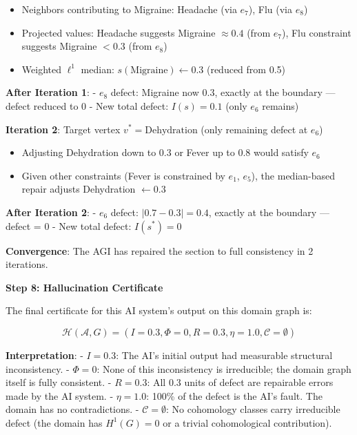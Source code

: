 \documentclass[
]{article}
\providecommand{\tightlist}{%
  \setlength{\itemsep}{0pt}\setlength{\parskip}{0pt}}
\begin{document}
\begin{itemize}
\tightlist
\item
  Neighbors contributing to Migraine: Headache (via \(e_7\)), Flu (via
  \(e_8\))
\item
  Projected values: Headache suggests Migraine \(\approx 0.4\) (from
  \(e_7\)), Flu constraint suggests Migraine \(< 0.3\) (from \(e_8\))
\item
  Weighted \(\ell^1\) median: \(s(\text{Migraine}) \gets 0.3\) (reduced
  from 0.5)
\end{itemize}

\textbf{After Iteration 1}: - \(e_8\) defect: Migraine now 0.3, exactly
at the boundary --- defect reduced to 0 - New total defect:
\(I(s) = 0.1\) (only \(e_6\) remains)

\textbf{Iteration 2}: Target vertex \(v^* = \text{Dehydration}\) (only
remaining defect at \(e_6\))

\begin{itemize}
\tightlist
\item
  Adjusting Dehydration down to 0.3 or Fever up to 0.8 would satisfy
  \(e_6\)
\item
  Given other constraints (Fever is constrained by \(e_1\), \(e_5\)),
  the median-based repair adjusts Dehydration \(\gets 0.3\)
\end{itemize}

\textbf{After Iteration 2}: - \(e_6\) defect: \(|0.7 - 0.3| = 0.4\),
exactly at the boundary --- defect = 0 - New total defect:
\(I(s^*) = 0\)

\textbf{Convergence}: The AGI has repaired the section to full
consistency in 2 iterations.

\textbf{Step 8: Hallucination Certificate}

The final certificate for this AI system's output on this domain graph
is:

\[\mathcal{H}(\mathcal{A}, G) = (I=0.3, \Phi=0, R=0.3, \eta=1.0, \mathcal{C}=\emptyset)\]

\textbf{Interpretation}: - \textbf{\(I = 0.3\)}: The AI's initial output
had measurable structural inconsistency. - \textbf{\(\Phi = 0\)}: None
of this inconsistency is irreducible; the domain graph itself is fully
consistent. - \textbf{\(R = 0.3\)}: All 0.3 units of defect are
repairable errors made by the AI system. - \textbf{\(\eta = 1.0\)}:
100\% of the defect is the AI's fault. The domain has no contradictions.
- \textbf{\(\mathcal{C} = \emptyset\)}: No cohomology classes carry
irreducible defect (the domain has \(H^1(G) = 0\) or a trivial
cohomological contribution).
\end{document}
